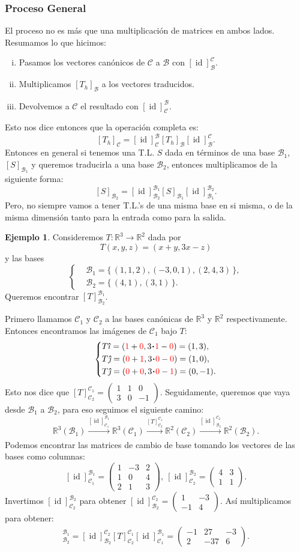 \documentclass[12pt]{article}
\theoremstyle{plain}
\theoremstyle{definition}
\newtheorem{Ex}[Th]{Ejemplo}           %
\theoremstyle{remark}
\DeclareMathOperator{\id}{id}       %
\newcommand{\ii}{\vu{\imath}}
\newcommand{\jj}{\vu{\jmath}}
\newcommand{\bR}{\mathbb{R}}        %
\newcommand{\cB}{\mathcal{B}}       %
\newcommand{\cC}{\mathcal{C}}       %
\renewcommand{\:}{\colon}           %
\renewcommand{\.}{\Cdot}                %
\newcommand{\twobytwo}[4]{\begin{pmatrix} %
    #1 & #2 \\ #3 & #4 \end{pmatrix}}
\newcommand{\twobythree}[6]{\begin{pmatrix} %
        #1 & #2 & #3\\ #4 & #5 & #6 \end{pmatrix}}
\newcommand{\threebythree}[9]{\begin{pmatrix} %
  #1 & #2 & #3 \\ #4 & #5 & #6 \\ #7 & #8 & #9 \end{pmatrix}}
\newcommand{\set}[1]{\{\,#1\,\}}    %
\newcommand{\red}[1]{\textcolor{red}{#1}}
\begin{document}
\begin{multicols}{2}
\subsubsection*{Proceso General}
El proceso no es más que una multiplicación de matrices en ambos lados. Resumamos lo que hicimos:
\begin{enumerate}[i)]
  \itemsep=-0.5em
  \item Pasamos los vectores canónicos de $\cC$ a $\cB$ con $[\id]^\cC_\cB$.
  \item Multiplicamos $[T_h]_\cB$ a los vectores traducidos.
  \item Devolvemos a $\cC$ el resultado con $[\id]^\cB_\cC$.
\end{enumerate}
Esto nos dice entonces que la operación completa es:
$$[T_h]_\cC=[\id]^\cB_\cC[T_h]_\cB[\id]^\cC_\cB.$$
Entonces en general si tenemos una T.L. $S$ dada en términos de una base $\cB_1$, $[S]_{\cB_1}$ y queremos traducirla a una base $\cB_2$, entonces multiplicamos de la siguiente forma:
$$[S]_{\cB_2}=[\id]_{\cB_2}^{\cB_1}[S]_{\cB_1}[\id]_{\cB_1}^{\cB_2}.$$
Pero, no siempre vamos a tener T.L.'s de una misma base en si misma, o de la misma dimensión tanto para la entrada como para la salida.

\begin{Ex}
  Consideremos $T:\bR^3\to\bR^2$ dada por 
  $$T(x,y,z)=(x+y,3x-z)$$ 
  y las bases 
  $$\left\lbrace
  \begin{aligned}
    &\cB_1=\set{(1,1,2),(-3,0,1),(2,4,3)},\\
    &\cB_2=\set{(4,1),(3,1)}.
  \end{aligned}
  \right.$$
  Queremos encontrar $[T]_{\cB_2}^{\cB_1}$.\par 
  Primero llamamos $\cC_1$ y $\cC_2$ a las bases canónicas de $\bR^3$ y $\bR^2$ respectivamente. Entonces encontramos las imágenes de $\cC_1$ bajo $T$:
  $$\left\lbrace
  \begin{aligned}
    &T\ii=(\red{1}+\red{0},3\.\red{1}-\red{0})=(1,3),\\
    &T\jj=(\red{0}+\red{1},3\.\red{0}-\red{0})=(1,0),\\
    &T\jj=(\red{0}+\red{0},3\.\red{0}-\red{1})=(0,-1).
  \end{aligned}
  \right.$$
  Esto nos dice que $[T]_{\cC_2}^{\cC_1}=\twobythree{1}{1}{0}{3}{0}{-1}$. Seguidamente, queremos que vaya desde $\cB_1$ a $\cB_2$, para eso seguimos el siguiente camino:
  $$\bR^3(\cB_1)\xrightarrow[]{[\id]_{\cC_1}^{\cB_1}}\bR^3(\cC_1)\xrightarrow[]{[T]_{\cC_2}^{\cC_1}}\bR^2(\cC_2)\xrightarrow[]{[\id]_{\cB_2}^{\cC_2}}\bR^2(\cB_2).$$
  Podemos encontrar las matrices de cambio de base tomando los vectores de las bases como columnas:
  $$[\id]_{\cC_1}^{\cB_1}=\threebythree{1}{-3}{2}{1}{0}{4}{2}{1}{3},\ [\id]_{\cC_2}^{\cB_2}=\twobytwo{4}{3}{1}{1}.$$
  Invertimos $[\id]_{\cC_2}^{\cB_2}$ para obtener $[\id]_{\cB_2}^{\cC_2}=\twobytwo{1}{-3}{-1}{4}$. Así multiplicamos para obtener:
  \begin{align*}
    [T]^{\cB_1}_{\cB_2}=[\id]_{\cB_2}^{\cC_2}[T]_{\cC_2}^{\cC_1}[\id]_{\cC_1}^{\cB_1}=\twobythree{-1}{27}{-3}{2}{-37}{6}.
  \end{align*}
\end{Ex}


\end{multicols}
\end{document}
